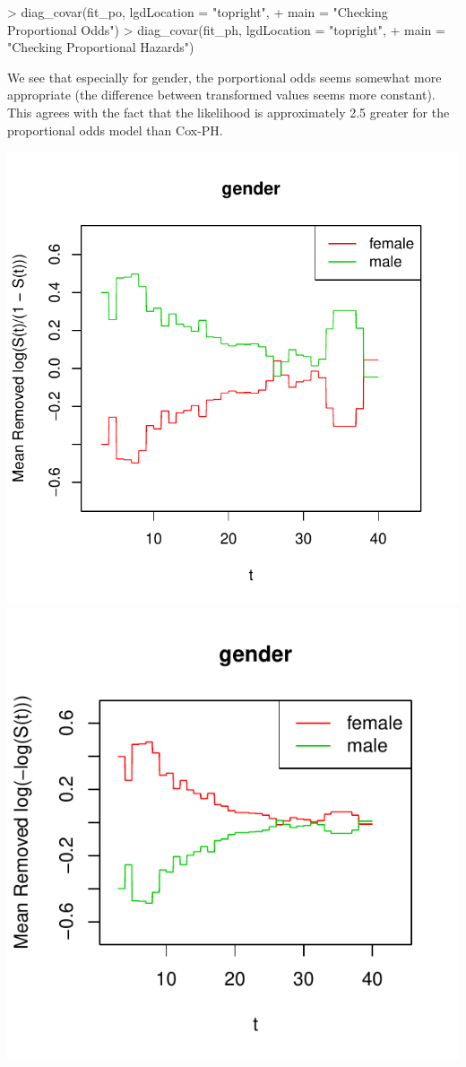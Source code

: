 \documentclass[a4paper]{article}
\begin{document}
\begin{Schunk}
\begin{Sinput}
> diag_covar(fit_po, lgdLocation = "topright", 
+            main = "Checking Proportional Odds")
> diag_covar(fit_ph, lgdLocation = "topright", 
+            main = "Checking Proportional Hazards")
\end{Sinput}
\end{Schunk}

We see that especially for gender, the porportional odds
seems somewhat more appropriate (the difference between 
transformed values seems more constant). This agrees
with the fact that the likelihood is approximately 2.5 greater
for the proportional odds model than Cox-PH. 
  
\begin{minipage}[t]{.85\linewidth}%
\includegraphics{icenReg-027}
\includegraphics{icenReg-028}

\end{minipage}
\end{document}
